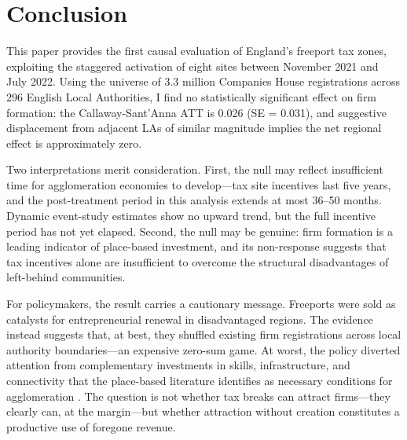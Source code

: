 \documentclass[12pt]{article}
\begin{document}
\label{apep_main_text_end}

\section{Conclusion}\label{sec:conclusion}

This paper provides the first causal evaluation of England's freeport tax zones, exploiting the staggered activation of eight sites between November 2021 and July 2022. Using the universe of 3.3 million Companies House registrations across 296 English Local Authorities, I find no statistically significant effect on firm formation: the Callaway-Sant'Anna ATT is 0.026 (SE = 0.031), and suggestive displacement from adjacent LAs of similar magnitude implies the net regional effect is approximately zero.

Two interpretations merit consideration. First, the null may reflect insufficient time for agglomeration economies to develop---tax site incentives last five years, and the post-treatment period in this analysis extends at most 36--50 months. Dynamic event-study estimates show no upward trend, but the full incentive period has not yet elapsed. Second, the null may be genuine: firm formation is a leading indicator of place-based investment, and its non-response suggests that tax incentives alone are insufficient to overcome the structural disadvantages of left-behind communities.

For policymakers, the result carries a cautionary message. Freeports were sold as catalysts for entrepreneurial renewal in disadvantaged regions. The evidence instead suggests that, at best, they shuffled existing firm registrations across local authority boundaries---an expensive zero-sum game. At worst, the policy diverted attention from complementary investments in skills, infrastructure, and connectivity that the place-based literature identifies as necessary conditions for agglomeration \citep{kline2014people, criscuolo2019}. The question is not whether tax breaks can attract firms---they clearly can, at the margin---but whether attraction without creation constitutes a productive use of foregone revenue.

\newpage

\singlespacing



\newpage

\end{document}
